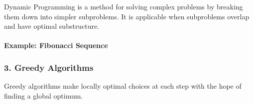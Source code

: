 Dynamic Programming is a method for solving complex problems by breaking
them down into simpler subproblems. It is applicable when subproblems
overlap and have optimal substructure.

\hypertarget{example-fibonacci-sequence}{%
\paragraph{Example: Fibonacci
Sequence}\label{example-fibonacci-sequence}}

\begin{Shaded}
\begin{Highlighting}[]
 
       \NormalTok{(}
        \NormalTok{) \{}
\NormalTok{        \}}

         \NormalTok{[n + }\NormalTok{];}
\NormalTok{        dp[}\NormalTok{] = }\NormalTok{;}
\NormalTok{        dp[}\NormalTok{] = }\NormalTok{;}

        \NormalTok{ (}
\NormalTok{            dp[i] = dp[i {-} }\NormalTok{] + dp[i {-} }\NormalTok{];}
\NormalTok{        \}}

\NormalTok{    \}}

       \NormalTok{(}
        \NormalTok{(}\NormalTok{(}\NormalTok{));  }
\NormalTok{    \}}
\NormalTok{\}}
\end{Highlighting}
\end{Shaded}

\hypertarget{greedy-algorithms}{%
\subsubsection{3. Greedy Algorithms}\label{greedy-algorithms}}

Greedy algorithms make locally optimal choices at each step with the
hope of finding a global optimum.

